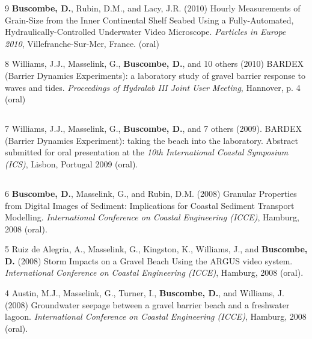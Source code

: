 \documentclass[margin,line]{resume}
\begin{document}
\begin{resume}
\begin{footnotesize}
\begin{list1}
	\item[9] {\bf Buscombe, D.}, Rubin, D.M., and Lacy, J.R. (2010) Hourly Measurements of Grain-Size from the Inner Continental Shelf Seabed Using a Fully-Automated, Hydraulically-Controlled Underwater Video Microscope. {\sl Particles in Europe 2010}, Villefranche-Sur-Mer, France. (oral)\\

	\item[8] Williams, J.J., Masselink, G., {\bf Buscombe, D.}, and 10 others (2010) BARDEX (Barrier Dynamics Experiments): a laboratory study of gravel barrier response to waves and tides. {\sl Proceedings of Hydralab III Joint User Meeting}, Hannover, p. 4 (oral)
	\end{list1}
	
	\subsection{}
	\begin{list1}
	\item[7] Williams, J.J., Masselink, G., {\bf Buscombe, D.}, and 7 others (2009). BARDEX (Barrier Dynamics Experiment): taking the beach into the laboratory. Abstract submitted for oral presentation at the {\sl 10th International Coastal Symposium (ICS)}, Lisbon, Portugal 2009 (oral).
	\end{list1}

	\subsection{}
	\begin{list1}
	\item[6] {\bf Buscombe, D.}, Masselink, G., and Rubin, D.M. (2008) Granular Properties from Digital Images of Sediment: Implications for Coastal Sediment Transport Modelling. {\sl International Conference on Coastal Engineering (ICCE)}, Hamburg, 2008 (oral).\\
	
	\item[5] Ruiz de Alegria, A., Masselink, G., Kingston, K., Williams, J., and {\bf Buscombe, D.} (2008) Storm Impacts on a Gravel Beach Using the ARGUS video system. {\sl International Conference on Coastal Engineering (ICCE)}, Hamburg, 2008 (oral).\\
	
	\item[4] Austin, M.J., Masselink, G., Turner, I., {\bf Buscombe, D.}, and Williams, J. (2008) Groundwater seepage between a gravel barrier beach and a freshwater lagoon. {\sl International Conference on Coastal Engineering (ICCE)}, Hamburg, 2008 (oral).\\
	

\end{list1}
\end{footnotesize}
\end{resume}
\end{document}
